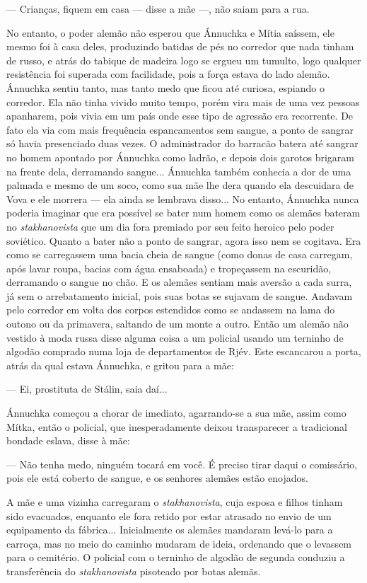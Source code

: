 --- Crianças, fiquem em casa --- disse a mãe ---, não saiam para a rua.

No entanto, o poder alemão não esperou que Ánnuchka e Mítia saíssem, ele
mesmo foi à casa deles, produzindo batidas de pés no corredor que nada
tinham de russo, e atrás do tabique de madeira logo se ergueu um
tumulto, logo qualquer resistência foi superada com facilidade, pois a
força estava do lado alemão. Ánnuchka sentiu tanto, mas tanto medo que
ficou até curiosa, espiando o corredor. Ela não tinha vivido muito
tempo, porém vira mais de uma vez pessoas apanharem, pois vivia em um
país onde esse tipo de agressão era recorrente. De fato ela via com mais
frequência espancamentos sem sangue, a ponto de sangrar só havia
presenciado duas vezes. O administrador do barracão batera até sangrar
no homem apontado por Ánnuchka como ladrão, e depois dois garotos
brigaram na frente dela, derramando sangue... Ánnuchka também conhecia a
dor de uma palmada e mesmo de um soco, como sua mãe lhe dera quando ela
descuidara de Vova e ele morrera --- ela ainda se lembrava disso... No
entanto, Ánnuchka nunca poderia imaginar que era possível se bater num
homem como os alemães bateram no \emph{stakhanovista} que um dia fora
premiado por seu feito heroico pelo poder soviético. Quanto a bater não
a ponto de sangrar, agora isso nem se cogitava. Era como se carregassem
uma bacia cheia de sangue (como donas de casa carregam, após lavar
roupa, bacias com água ensaboada) e tropeçassem na escuridão, derramando
o sangue no chão. E os alemães sentiam mais aversão a cada surra, já sem
o arrebatamento inicial, pois suas botas se sujavam de sangue. Andavam
pelo corredor em volta dos corpos estendidos como se andassem na lama do
outono ou da primavera, saltando de um monte a outro. Então um alemão
não vestido à moda russa disse alguma coisa a um policial usando um
terninho de algodão comprado numa loja de departamentos de Rjév. Este
escancarou a porta, atrás da qual estava Ánnuchka, e gritou para a mãe:

--- Ei, prostituta de Stálin, saia daí...

Ánnuchka começou a chorar de imediato, agarrando-se a sua mãe, assim
como Mítka, então o policial, que inesperadamente deixou transparecer a
tradicional bondade eslava, disse à mãe:

--- Não tenha medo, ninguém tocará em você. É preciso tirar daqui o
comissário, pois ele está coberto de sangue, e os senhores alemães estão
enojados.

A mãe e uma vizinha carregaram o \emph{stakhanovista}, cuja esposa e
filhos tinham sido evacuados, enquanto ele fora retido por estar
atrasado no envio de um equipamento da fábrica... Inicialmente os
alemães mandaram levá-lo para a carroça, mas no meio do caminho mudaram
de ideia, ordenando que o levassem para o cemitério. O policial com o
terninho de algodão de segunda conduziu a transferência do
\emph{stakhanovista} pisoteado por botas alemãs.

